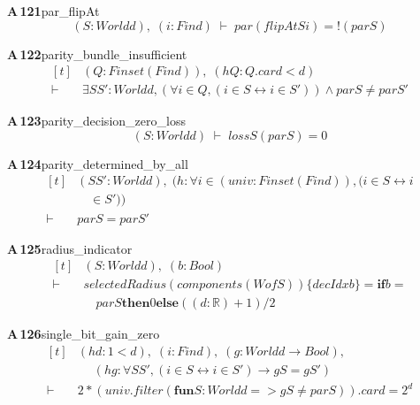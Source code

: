 \documentclass[conference]{IEEEtran}
\theoremstyle{definition}
\newcommand{\lean}[1]{\textsf{\footnotesize #1}}
\begin{document}
\noindent\textbf{A\,121}\quad\lean{par\_flipAt}
{\footnotesize\[ (\mathit{S} : \mathit{World} \mathit{d}),\; (\mathit{i} : \mathit{Fin} \mathit{d}) \;\vdash\; \mathit{par} (\mathit{flipAt} \mathit{S} \mathit{i}) = !(\mathit{par} \mathit{S}) \]}

\noindent\textbf{A\,122}\quad\lean{parity\_bundle\_insufficient}
{\footnotesize\[ \begin{aligned}[t]
&(\mathit{Q} : \mathit{Finset} (\mathit{Fin} \mathit{d})),\; (\mathit{hQ} : \mathit{Q}.\mathit{card} < \mathit{d})\\
\vdash\;&\exists \mathit{S} \mathit{S'} : \mathit{World} \mathit{d}, (\forall \mathit{i} \in \mathit{Q}, (\mathit{i} \in \mathit{S} \leftrightarrow \mathit{i} \in \mathit{S'})) \wedge \mathit{par} \mathit{S} \neq \mathit{par} \mathit{S'}
\end{aligned} \]}

\noindent\textbf{A\,123}\quad\lean{parity\_decision\_zero\_loss}
{\footnotesize\[ (\mathit{S} : \mathit{World} \mathit{d}) \;\vdash\; \mathit{loss} \mathit{S} (\mathit{par} \mathit{S}) = 0 \]}

\noindent\textbf{A\,124}\quad\lean{parity\_determined\_by\_all}
{\footnotesize\[ \begin{aligned}[t]
&(\mathit{S} \mathit{S'} : \mathit{World} \mathit{d}),\; (\mathit{h} : \forall \mathit{i} \in (\mathit{univ} : \mathit{Finset} (\mathit{Fin} \mathit{d})), (\mathit{i} \in \mathit{S} \leftrightarrow \mathit{i}\\
&\quad \in \mathit{S'}))\\
\vdash\;&\mathit{par} \mathit{S} = \mathit{par} \mathit{S'}
\end{aligned} \]}

\noindent\textbf{A\,125}\quad\lean{radius\_indicator}
{\footnotesize\[ \begin{aligned}[t]
&(\mathit{S} : \mathit{World} \mathit{d}),\; (\mathit{b} : \mathit{Bool})\\
\vdash\;&\mathit{selectedRadius} (\mathit{components} (\mathit{Wof} \mathit{S})) \{ \mathit{decIdx} \mathit{b}\} = \mathbf{if} \mathit{b} =\\
&\quad \mathit{par} \mathit{S} \mathbf{then} 0 \mathbf{else} ((\mathit{d} : \mathbb{R} ) + 1) / 2
\end{aligned} \]}

\noindent\textbf{A\,126}\quad\lean{single\_bit\_gain\_zero}
{\footnotesize\[ \begin{aligned}[t]
&(\mathit{hd} : 1 < \mathit{d}),\; (\mathit{i} : \mathit{Fin} \mathit{d}),\; (\mathit{g} : \mathit{World} \mathit{d} \to \mathit{Bool}),\\
&\quad \; (\mathit{hg} : \forall \mathit{S} \mathit{S'}, (\mathit{i} \in \mathit{S} \leftrightarrow \mathit{i} \in \mathit{S'}) \to \mathit{g} \mathit{S} = \mathit{g} \mathit{S'})\\
\vdash\;&2 * (\mathit{univ}.\mathit{filter} (\mathbf{fun} \mathit{S} : \mathit{World} \mathit{d} => \mathit{g} \mathit{S} \neq \mathit{par} \mathit{S})).\mathit{card} = 2 ^{\mathit{d}}
\end{aligned} \]}
\end{document}
